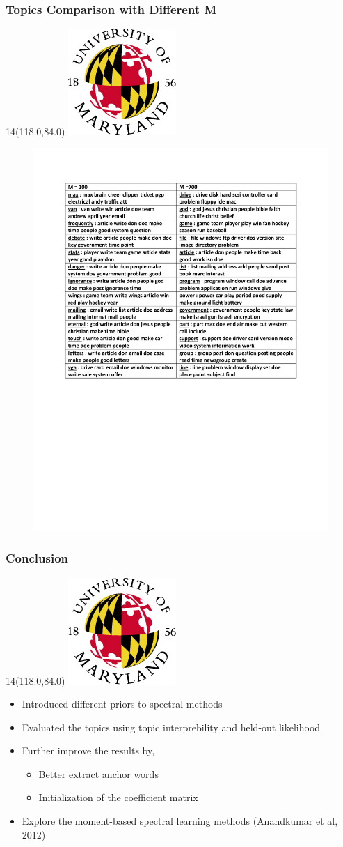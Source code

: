 \documentclass{beamer}
\let\oldframetitle\frametitle
\renewcommand{\frametitle}[1]{
\oldframetitle{#1}
\BottomLogo
}
\newcommand{\BottomLogo}{
\begin{textblock}{14}(118.0,84.0)
\includegraphics[height=.8cm]{figures/umd-logo1.jpg}
\end{textblock}
}
\begin{document}
\begin{frame}
\frametitle{Topics Comparison with Different M}

\begin{figure}
\includegraphics[width=0.7\linewidth]{figures/M_100_700_topics.pdf}
\end{figure}

\end{frame}

\begin{frame}
\frametitle{Conclusion}
\begin{itemize}
\item Introduced different priors to spectral methods
\item Evaluated the topics using topic interprebility and held-out likelihood
\item Further improve the results by,
\begin{itemize}
\item Better extract anchor words
\item Initialization of the coefficient matrix
\end{itemize}
\item Explore the moment-based spectral learning methods (Anandkumar et al, 2012)
\end{itemize}

\end{frame}
\end{document}
